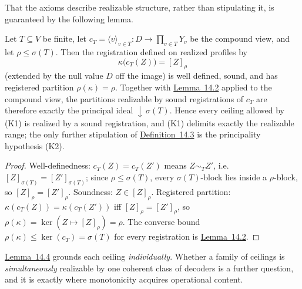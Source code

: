 That the axioms describe realizable structure, rather than stipulating it, is guaranteed by the following lemma.

\begin{thmplain}

Let \(T \subseteq V\) be finite, let \(c_T = \langle v \rangle_{v \in T} : D \to \prod_{v \in T} Y_v\) be the compound view, and let \(\rho \le \sigma(T)\). Then the registration defined on realized profiles by
\[
\kappa\big(c_T(Z)\big) = [Z]_\rho
\]
(extended by the null value \(D\) off the image) is well defined, sound, and has registered partition \(\rho(\kappa) = \rho\). Together with \hyperlink{stmt:14.2}{Lemma~14.2} applied to the compound view, the partitions realizable by sound registrations of \(c_T\) are therefore exactly the principal ideal \({\downarrow}\,\sigma(T)\). Hence every ceiling allowed by (K1) is realized by a sound registration, and (K1) delimits exactly the realizable range; the only further stipulation of \hyperlink{stmt:14.3}{Definition~14.3} is the principality hypothesis (K2).
\end{thmplain}

\begin{proof}

Well-definedness: \(c_T(Z) = c_T(Z')\) means \(Z \sim_T Z'\), i.e.~\([Z]_{\sigma(T)} = [Z']_{\sigma(T)}\); since \(\rho \le \sigma(T)\), every \(\sigma(T)\)-block lies inside a \(\rho\)-block, so \([Z]_\rho = [Z']_\rho\). Soundness: \(Z \in [Z]_\rho\). Registered partition: \(\kappa(c_T(Z)) = \kappa(c_T(Z'))\) iff \([Z]_\rho = [Z']_\rho\), so \(\rho(\kappa) = \ker(Z \mapsto [Z]_\rho) = \rho\). The converse bound \(\rho(\kappa) \le \ker(c_T) = \sigma(T)\) for every registration is \hyperlink{stmt:14.2}{Lemma~14.2}.
\end{proof}

\hyperlink{stmt:14.4}{Lemma~14.4} grounds each ceiling \emph{individually}. Whether a family of ceilings is \emph{simultaneously} realizable by one coherent class of decoders is a further question, and it is exactly where monotonicity acquires operational content.

